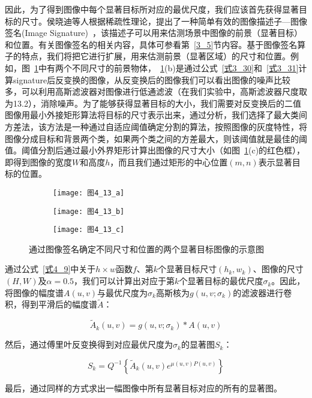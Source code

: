 因此，为了得到图像中每个显著目标所对应的最优尺度，我们应该首先获得显著目标的尺寸。侯晓迪等人根据稀疏性理论，提出了一种简单有效的图像描述子---图像签名(Image Signature)~\cite{HouXiaodiTPAMI2012Signature}，该描述子可以用来估测场景中图像的前景（显著目标）和位置。有关图像签名的相关内容，具体可参看第~\ref{3_5}节内容。基于图像签名算子的特点，我们将把它进行扩展，用来估测前景（显著区域）的尺寸和位置。例如，图~\ref{图4_13}中有两个不同尺寸的前景物体，~\ref{图4_13}(b)是通过公式~\ref{式3_30}和~\ref{式3_31}计算signature后反变换的图像，从反变换后的图像我们可以看出图像的噪声比较多，可以利用高斯滤波器对图像进行低通滤波（在我们实验中，高斯滤波器尺度取为13.2），消除噪声。为了能够获得显著目标的大小，我们需要对反变换后的二值图像用最小外接矩形算法将目标的尺寸表示出来，通过分析，我们选择了最大类间方差法，该方法是一种通过自适应阈值确定分割的算法，按照图像的灰度特性，将图像分成目标和背景两个类，如果两个类之间的方差最大，则该阈值就是最佳的阈值。阈值分割后通过最小外界矩形计算出图像的尺寸大小（如图~\ref{图4_13}(c)的红色框），即得到图像的宽度$W$和高度$h$，而且我们通过矩形的中心位置$(m,n)$表示显著目标的位置。
\begin{figure}[h]
  \centering%
  \begin{subfigure}{3cm}
    \texttt{[image: 图4\_13\_a]}
    \caption{}
  \end{subfigure}
  \hspace{4em}%
  \begin{subfigure}{0.2\textwidth}
    \texttt{[image: 图4\_13\_b]}
    \caption{}
  \end{subfigure}
  \hspace{4em}%
  \begin{subfigure}{0.25\textwidth}
    \texttt{[image: 图4\_13\_c]}
    \caption{}
  \end{subfigure}
  \caption{通过图像签名确定不同尺寸和位置的两个显著目标图像的示意图}
  \label{图4_13}
\end{figure}

通过公式~\ref{式4_9}中关于$h×w$函数$f$、第$k$个显著目标尺寸$(h_{k},w_{k})$、图像的尺寸$(H,W)$及$\alpha=0.5$，我们可以计算出对应于第$k$个显著目标的最优尺度$\sigma_{k}$。因此，将图像的幅度谱$A(u,v)$与最优尺度为$\sigma_{k}$高斯核为$g(u,v;\sigma_{k})$的滤波器进行卷积，得到平滑后的幅度谱$\tilde{A}$： 
\begin{linenomath}
\begin{equation}
\tilde{A}_k(u,v)=g(u,v;\sigma_k)\ast A(u,v)
\label{式4_25}
\end{equation}
\end{linenomath}
然后，通过傅里叶反变换得到对应最优尺度为$\sigma_{k}$的显著图$S_{k}$：
\begin{linenomath}
\begin{equation}
S_k=Q^{-1}\left\{\tilde{A}_k(u,v)e^{\mu(u,v)P(u,v)}\right\}
\label{式4_26}
\end{equation}
\end{linenomath}
最后，通过同样的方式求出一幅图像中所有显著目标对应的所有的显著图。

